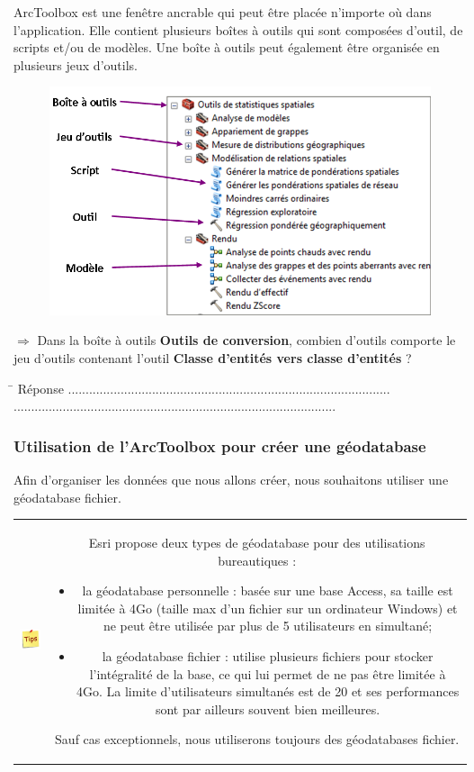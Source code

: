 \documentclass[11pt]{article}
\newcommand{\action}{$\Rightarrow$ }
\newcommand{\reponse}{
	\begin{tabbing}
	\hspace{2cm}\=\kill
	Réponse \> ............................................................................................ \\
 	\> ............................................................................................
	\end{tabbing}
}
\newenvironment{note}{%
	\begin{tabular}[t t]{c c}
		\includegraphics{img/tips.png}
		 &
		\begin{minipage}[c]{0.9\linewidth}
			\begin{sffamily}
}{%
			\end{sffamily}
		\end{minipage}
	\end{tabular}
}
\begin{document}
ArcToolbox est une fenêtre ancrable qui peut être placée n'importe où dans l'application. Elle contient plusieurs boîtes à outils qui sont composées d'outil, de scripts et/ou de modèles. Une boîte à outils peut également être organisée en plusieurs jeux d'outils.
\begin{figure}[H]
	\center \includegraphics{img/td3/arctoolbox_composition.png}\\
\end{figure}

\action Dans la boîte à outils \textbf{Outils de conversion}, combien d'outils comporte le jeu d'outils contenant l'outil \textbf{Classe d'entités vers classe d'entités} ?

\reponse


\subsubsection{Utilisation de l'ArcToolbox pour créer une géodatabase}
Afin d'organiser les données que nous allons créer, nous souhaitons utiliser une géodatabase fichier.

\begin{note}
Esri propose deux types de géodatabase pour des utilisations bureautiques :
\begin{itemize}
	\item la géodatabase personnelle : basée sur une base Access, sa taille est limitée à 4Go (taille max d'un fichier sur un ordinateur Windows) et ne peut être utilisée par plus de 5 utilisateurs en simultané;
	\item la géodatabase fichier : utilise plusieurs fichiers pour stocker l'intégralité de la base, ce qui lui permet de ne pas être limitée à 4Go. La limite d'utilisateurs simultanés est de 20 et ses performances sont par ailleurs souvent bien meilleures.
\end{itemize}
Sauf cas exceptionnels, nous utiliserons toujours des géodatabases fichier.
\end{note}
\end{document}
